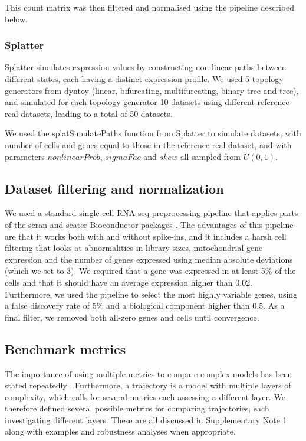This count matrix was then filtered and normalised using the pipeline described below.

\subsubsection{Splatter}

Splatter \cite{zappia_splattersimulationsinglecell_2017} simulates expression values by constructing non-linear paths between different states, each having a distinct expression profile. We used 5 topology generators from dyntoy (linear, bifurcating, multifurcating, binary tree and tree), and simulated for each topology generator 10 datasets using different reference real datasets, leading to a total of 50 datasets.

We used the splatSimulatePaths function from Splatter to simulate datasets, with number of cells and genes equal to those in the reference real dataset, and with parameters  $\textit{nonlinearProb}$, $\textit{sigmaFac}$ and $\textit{skew}$ all sampled from $U(0, 1)$.

\subsection{Dataset filtering and normalization}

We used a standard single-cell RNA-seq preprocessing pipeline that applies parts of the scran and scater Bioconductor packages \cite{lun_stepbystepworkflowlowlevel_2016}. The advantages of this pipeline are that it works both with and without spike-ins, and it includes a harsh cell filtering that looks at abnormalities in library sizes, mitochondrial gene expression and the number of genes expressed using median absolute deviations (which we set to 3). We required that a gene was expressed in at least 5$\%$ of the cells and that it should have an average expression higher than 0.02. Furthermore, we used the pipeline to select the most highly variable genes, using a false discovery rate of 5$\%$ and a biological component higher than 0.5. As a final filter, we removed both all-zero genes and cells until convergence.

\subsection{Benchmark metrics}

The importance of using multiple metrics to compare complex models has been stated repeatedly \cite{norel_selfassessmenttrapcan_2011}. Furthermore, a trajectory is a model with multiple layers of complexity, which calls for several metrics each assessing a different layer. We therefore defined several possible metrics for comparing trajectories, each investigating different layers. These are all discussed in Supplementary Note 1 along with examples and robustness analyses when appropriate.

